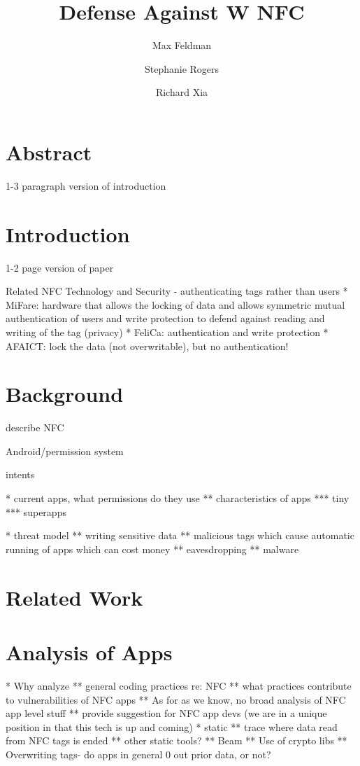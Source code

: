 \documentclass[12pt]{article}
\begin{document}
\title{Defense Against W NFC}
\author{Max Feldman \and Stephanie Rogers \and Richard Xia}
\maketitle

\section{Abstract}
1-3 paragraph version of introduction

\section{Introduction}
1-2 page version of paper

Related NFC Technology and Security - authenticating tags rather than users
* MiFare: hardware that allows the locking of data and allows symmetric mutual authentication of users and write protection to defend against reading and writing of the tag (privacy)
* FeliCa: authentication and write protection 
* AFAICT: lock the data (not overwritable), but no authentication!

\section{Background}
describe NFC

Android/permission system

intents

* current apps, what permissions do they use
** characteristics of apps
*** tiny
*** superapps

* threat model
** writing sensitive data
** malicious tags which cause automatic running of apps which can cost money
** eavesdropping
** malware

\section{Related Work}

\section{Analysis of Apps}
* Why analyze
** general coding practices re: NFC
** what practices contribute to vulnerabilities of NFC apps
** As for as we know, no broad analysis of NFC app level stuff
** provide suggestion for NFC app devs (we are in a unique position in that this tech is up and coming)
* static
** trace where data read from NFC tags is ended
** other static tools?
** Beam
** Use of crypto libs
** Overwriting tags- do apps in general 0 out prior data, or not?
\end{document}
